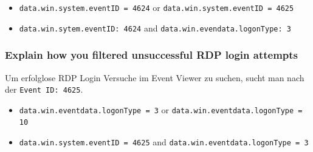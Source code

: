 \begin{itemize}
    \item \lstinline|data.win.system.eventID = 4624| or \lstinline|data.win.system.eventID = 4625|
    \item \lstinline|data.win.sytem.eventID: 4624| and \lstinline|data.win.evendata.logonType: 3|
\end{itemize}

\subsubsection{Explain how you filtered unsuccessful RDP login attempts}
Um erfolglose RDP Login Versuche im Event Viewer zu suchen, sucht man nach der \lstinline|Event ID: 4625|.\\

\begin{itemize}
    \item \lstinline|data.win.eventdata.logonType = 3| or \lstinline|data.win.eventdata.logonType = 10|
    \item \lstinline|data.win.system.eventID = 4625| and \lstinline|data.win.eventdata.logonType = 3|
\end{itemize}